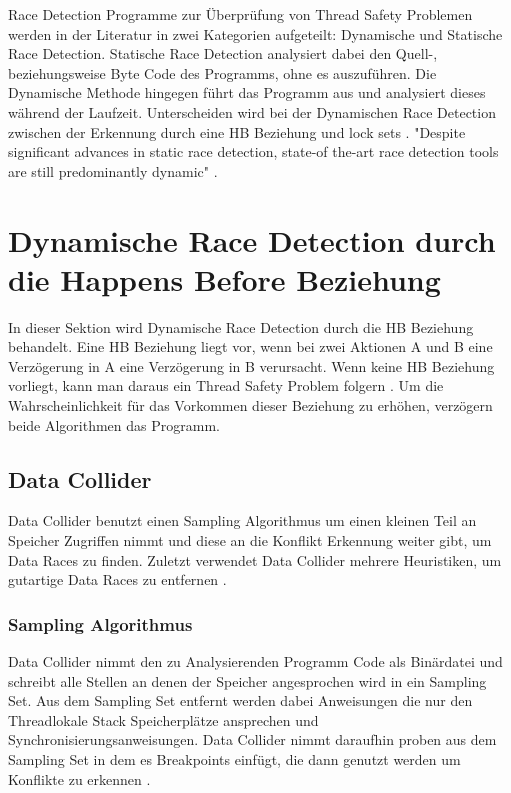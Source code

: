 Race Detection Programme zur Überprüfung von Thread Safety Problemen werden in der Literatur in zwei Kategorien aufgeteilt: Dynamische und Statische Race Detection. Statische Race Detection analysiert dabei den Quell-, beziehungsweise Byte Code des Programms, ohne es auszuführen. Die Dynamische Methode hingegen führt das Programm aus und analysiert dieses während der Laufzeit. Unterscheiden wird bei der Dynamischen Race Detection zwischen der Erkennung durch eine \ac{HB} Beziehung und lock sets \cite[vgl.][4]{erickson_effective_nodate}. "Despite significant advances in static race detection, state-of the-art race detection tools are still predominantly dynamic" \cite[308]{naik_effective_nodate}.

\section{Dynamische Race Detection durch die Happens Before Beziehung}

In dieser Sektion wird Dynamische Race Detection durch die \acs{HB} Beziehung behandelt. Eine \acs{HB} Beziehung liegt vor, wenn bei zwei Aktionen A und B eine Verzögerung in A eine Verzögerung in B verursacht. Wenn keine \acs{HB} Beziehung vorliegt, kann man daraus ein Thread Safety Problem folgern \cite[vgl.][163]{li_efficient_2019}. Um die Wahrscheinlichkeit für das Vorkommen dieser Beziehung zu erhöhen, verzögern beide Algorithmen das Programm.

\subsection*{Data Collider}

Data Collider benutzt einen Sampling Algorithmus um einen kleinen Teil an Speicher Zugriffen nimmt und diese an die Konflikt Erkennung weiter gibt, um Data Races zu finden. Zuletzt verwendet Data Collider mehrere Heuristiken, um gutartige Data Races zu entfernen \cite[vgl.][6]{erickson_effective_nodate}.  

\subsubsection*{Sampling Algorithmus}

Data Collider nimmt den zu Analysierenden Programm Code als Binärdatei und schreibt alle Stellen an denen der Speicher angesprochen wird in ein Sampling Set. Aus dem Sampling Set entfernt werden dabei Anweisungen die nur den Threadlokale Stack Speicherplätze ansprechen und Synchronisierungsanweisungen. Data Collider nimmt daraufhin proben aus dem Sampling Set in dem es Breakpoints einfügt, die dann genutzt werden um Konflikte zu erkennen \cite[vgl.][6]{erickson_effective_nodate}. 


